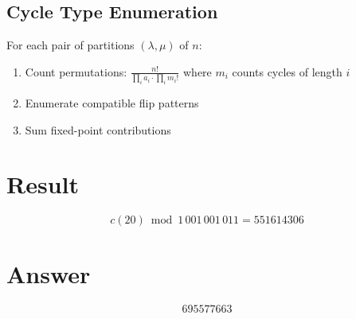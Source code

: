 \documentclass[12pt]{article}
\begin{document}
\subsection{Cycle Type Enumeration}
For each pair of partitions $(\lambda, \mu)$ of $n$:
\begin{enumerate}
  \item Count permutations: $\frac{n!}{\prod_i a_i \cdot \prod_i m_i!}$ where $m_i$ counts cycles of length $i$
  \item Enumerate compatible flip patterns
  \item Sum fixed-point contributions
\end{enumerate}

\section{Result}
\[
c(20) \bmod 1\,001\,001\,011 = \boxed{551614306}
\]

\section{Answer}

\[
\boxed{695577663}
\]
\end{document}
